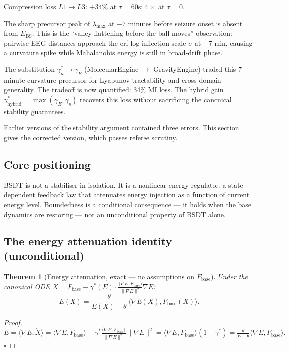 \documentclass[11pt,a4paper]{article}
\newtheorem{theorem}{Theorem}[section]
\theoremstyle{definition}
\newcommand{\Fbase}{F_{\mathrm{base}}}
\begin{document}
Compression loss $L1 \to L3$: $+34\%$ at $\tau=60$s; $4\times$ at $\tau=0$.

The sharp precursor peak of $\lambda_\mathrm{max}$ at $-7$ minutes before seizure onset
is absent from $E_\mathrm{BS}$.
This is the ``valley flattening before the ball moves'' observation:
pairwise EEG distances approach the erf-log inflection scale $\sigma$ at $-7$ min,
causing a curvature spike while Mahalanobis energy is still in broad-drift phase.

The substitution $\gamma^*_\kappa \to \gamma_E$ (MolecularEngine $\to$ GravityEngine)
traded this 7-minute curvature precursor for Lyapunov tractability and
cross-domain generality. The tradeoff is now quantified: 34\% MI loss.
The hybrid gain $\gamma^*_\mathrm{hybrid} = \max(\gamma_E, \gamma_\kappa)$
recovers this loss without sacrificing the canonical stability guarantees.
\label{sec:lyapunov_corrected}

\noindent
Earlier versions of the stability argument contained three errors.
This section gives the corrected version, which passes referee scrutiny.

\subsection{Core positioning}

BSDT is not a stabiliser in isolation.
It is a nonlinear energy regulator: a state-dependent feedback law that
attenuates energy injection as a function of current energy level.
Boundedness is a conditional consequence --- it holds when the base dynamics
are restoring --- not an unconditional property of BSDT alone.

\subsection{The energy attenuation identity (unconditional)}

\begin{theorem}[Energy attenuation, exact --- no assumptions on $\Fbase$]
Under the canonical ODE $\dot X = \Fbase - \gamma^*(E)\cdot
\frac{\langle\nabla E,\Fbase\rangle}{\|\nabla E\|^2}\nabla E$:
\[
\dot E(X) = \frac{\theta}{E(X)+\theta}\,\langle\nabla E(X),\Fbase(X)\rangle.
\]
\end{theorem}

\begin{proof}
$\dot E = \langle\nabla E,\dot X\rangle
= \langle\nabla E,\Fbase\rangle - \gamma^*\frac{\langle\nabla E,\Fbase\rangle}{\|\nabla E\|^2}\|\nabla E\|^2
= \langle\nabla E,\Fbase\rangle(1-\gamma^*)
= \frac{\theta}{E+\theta}\langle\nabla E,\Fbase\rangle.$ $\square$
\end{proof}
\end{document}
